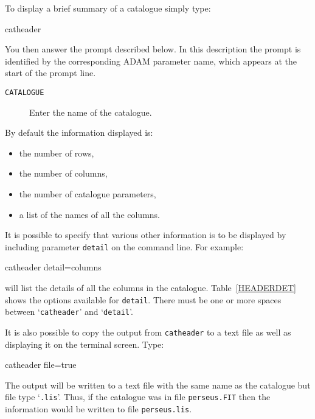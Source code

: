 \documentclass[twoside,11pt]{starlink}
\begin{document}
To display a brief summary of a catalogue simply type:

\begin{terminalv}
catheader
\end{terminalv}

You then answer the prompt described below.  In this description the
prompt is identified by the corresponding ADAM parameter name, which
appears at the start of the prompt line.

\begin{description}

  \item[ \texttt{CATALOGUE} ] Enter the name of the catalogue.

\end{description}

By default the information displayed is:

\begin{itemize}

  \item the number of rows,

  \item the number of columns,

  \item the number of catalogue parameters,

  \item a list of the names of all the columns.

\end{itemize}

It is possible to specify that various other information is to be
displayed by including parameter \texttt{detail} on the command line.  For
example:

\begin{terminalv}
catheader detail=columns
\end{terminalv}

will list the details of all the columns in the catalogue.
Table~\ref{HEADERDET} shows the options available for \texttt{detail}.
There must be one or more spaces between `\texttt{catheader}' and `\texttt{detail}'.

It is also possible to copy the output from \texttt{catheader} to a text
file as well as displaying it on the terminal screen.  Type:

\begin{terminalv}
catheader  file=true
\end{terminalv}

The output will be written to a text file with the same name as the
catalogue but file type `\texttt{.lis}'.  Thus, if the catalogue was in file
\texttt{perseus.FIT} then the information would be written to file
\texttt{perseus.lis}.
\end{document}
